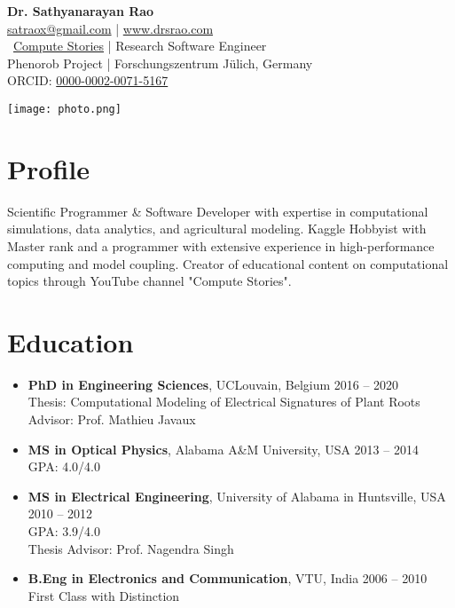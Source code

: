 \documentclass[11pt,a4paper]{article}
\begin{document}
\begin{minipage}{0.7\textwidth}
    {\LARGE \textbf{Dr. Sathyanarayan Rao}} \\
    \vspace{2mm}
    \href{mailto:satraox@gmail.com}{satraox@gmail.com} | \href{http://www.drsrao.com}{www.drsrao.com} \\
    \faYoutube\ \href{https://youtube.com/@ComputeStories}{Compute Stories} | 
    Research Software Engineer \\
    Phenorob Project | Forschungszentrum Jülich, Germany\\
    ORCID: \href{https://orcid.org/0000-0002-0071-5167}{0000-0002-0071-5167}
\end{minipage}
\begin{minipage}{0.3\textwidth}
    \texttt{[image: photo.png]}  %
\end{minipage}

\vspace{5mm}

\section*{Profile}
Scientific Programmer \& Software Developer with expertise in computational simulations, data analytics, and agricultural modeling. Kaggle Hobbyist with Master rank and a programmer with extensive experience in high-performance computing and model coupling. Creator of educational content on computational topics through YouTube channel "Compute Stories".

\section*{Education}
\begin{itemize}[leftmargin=*]
    \item \textbf{PhD in Engineering Sciences}, UCLouvain, Belgium \hfill 2016 -- 2020 \\
          Thesis: Computational Modeling of Electrical Signatures of Plant Roots \\
          Advisor: Prof. Mathieu Javaux
    \item \textbf{MS in Optical Physics}, Alabama A\&M University, USA \hfill 2013 -- 2014 \\
          GPA: 4.0/4.0
    \item \textbf{MS in Electrical Engineering}, University of Alabama in Huntsville, USA \hfill 2010 -- 2012 \\
          GPA: 3.9/4.0 \\
          Thesis Advisor: Prof. Nagendra Singh
    \item \textbf{B.Eng in Electronics and Communication}, VTU, India \hfill 2006 -- 2010 \\
          First Class with Distinction
\end{itemize}
\end{document}

